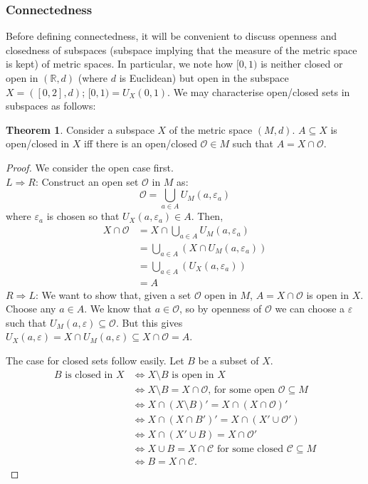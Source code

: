 \documentclass{article}
\theoremstyle{definition}
\newtheorem{thm}{Theorem}[subsubsection]
\begin{document}
\subsubsection{Connectedness}
Before defining connectedness, it will be convenient to discuss openness and closedness of subspaces (subspace implying that the measure of the metric space is kept) of metric spaces. In particular, we note how $[0,1)$ is neither closed or open in $(\mathbb{R},d)$ (where $d$ is Euclidean) but open in the subspace $X=([0,2],d)$; $[0,1)=U_{X}(0,1)$. We may characterise open/closed sets in subspaces as follows:
\begin{thm}
	Consider a subspace $X$ of the metric space $(M,d)$. $A\subseteq X$ is open/closed in $X$ iff there is an open/closed $\mathcal{O}\in M$ such that $A=X\cap \mathcal{O}$.
\end{thm}
\begin{proof}
	We consider the open case first.\\
	$L\Rightarrow R$: Construct an open set $\mathcal{O}$ in $M$ as:
	\[\mathcal{O}=\bigcup_{a\in A}U_M(a,\varepsilon_a)\]
	where $\varepsilon_a$ is chosen so that $U_X(a,\varepsilon_a)\in A$.
	Then, 
	\begin{align*}
		X\cap \mathcal{O}&=X\cap\bigcup_{a\in A}U_M(a,\varepsilon_a)\\
		&=\bigcup_{a\in A}(X\cap U_M(a,\varepsilon_a))\\
		&=\bigcup_{a\in A}(U_X(a,\varepsilon_a))\tag*{\footnotemark[1]}\\
		&=A\tag*{\footnotemark[2]}
	\end{align*}
	$R\Rightarrow L$: We want to show that, given a set $\mathcal{O}$ open in $M$, $A=X\cap \mathcal{O}$ is open in $X$. Choose any $a\in A$. We know that $a\in \mathcal{O}$, so by openness of $\mathcal{O}$ we can choose a $\varepsilon$ such that $U_M(a,\varepsilon)\subseteq \mathcal{O}$. But this gives $U_X(a,\varepsilon)=X\cap U_M(a,\varepsilon)\subseteq X\cap \mathcal{O}=A$.\par
	The case for closed sets follow easily. Let $B$ be a subset of $X$.
	\begin{align*}
		B\text{ is closed in }X&\iff X\setminus B\text{ is open in }X\\
		&\iff X\setminus B=X\cap \mathcal{O}\text{, for some open }\mathcal{O}\subseteq M\\
		&\iff X\cap(X\setminus B)'=X\cap(X\cap \mathcal{O})'\\
		&\iff X\cap(X\cap B')'=X\cap(X'\cup \mathcal{O}')\\
		&\iff X\cap(X'\cup B)=X\cap\mathcal{O}'\\
		&\iff X\cup B=X\cap\mathcal{C}\text{ for some closed }\mathcal{C}\subseteq M\\
		&\iff B=X\cap\mathcal{C}.
	\end{align*}
\end{proof}
\end{document}
